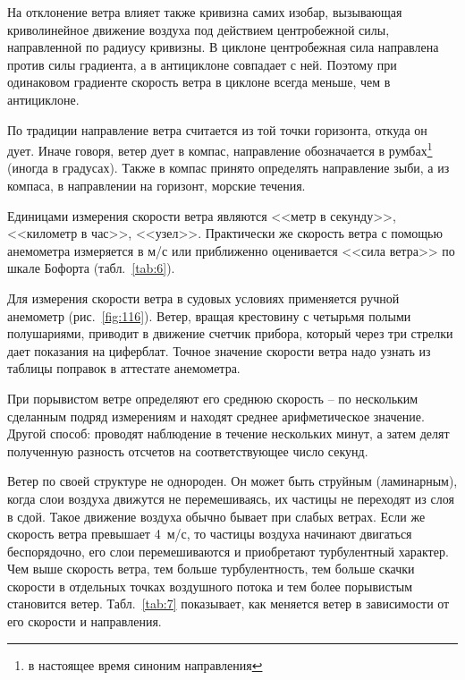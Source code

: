 \documentclass[a4paper, 12pt, twoside, final, book, russian, fittopage, cyremdash]{ncc}
\newcommand{\ris}[1]{\ref{fig:#1}}
\begin{document}
На отклонение ветра влияет также кривизна самих изобар, вызывающая криволинейное движение воздуха под действием центробежной силы, направленной по радиусу кривизны. В циклоне центробежная сила направлена против силы градиента, а в антициклоне совпадает с ней. Поэтому при одинаковом градиенте скорость ветра в циклоне всегда меньше, чем в антициклоне.

По традиции направление ветра считается из той точки горизонта, откуда он дует. Иначе говоря, ветер дует в компас, направление обозначается в румбах\footnote{в настоящее время синоним направления} (иногда в градусах). Также в компас принято определять направление зыби, а из компаса, в направлении на горизонт, морские течения.

Единицами измерения скорости ветра являются <<метр в секунду>>, <<километр в час>>, <<узел>>. Практически же скорость ветра с помощью анемометра измеряется в м/с или приближенно оценивается <<сила ветра>> по шкале Бофорта (табл.~\ref{tab:6}).

Для измерения скорости ветра в судовых условиях применяется ручной анемометр (рис.~\ris{116}). Ветер, вращая крестовину с четырьмя полыми полушариями, приводит в движение счетчик прибора, который через три стрелки дает показания на циферблат. Точное значение скорости ветра надо узнать из таблицы поправок в аттестате анемометра.

При порывистом ветре определяют его среднюю скорость \--- по нескольким сделанным подряд измерениям и находят среднее арифметическое значение. Другой способ: проводят наблюдение в течение нескольких минут, а затем делят полученную разность отсчетов на соответствующее число секунд.

Ветер по своей структуре не однороден. Он может быть струйным (ламинарным), когда слои воздуха движутся не перемешиваясь, их частицы не переходят из слоя в сдой. Такое движение воздуха обычно бывает при слабых ветрах. Если же скорость ветра превышает 4~м/с, то частицы воздуха начинают двигаться беспорядочно, его слои перемешиваются и приобретают турбулентный характер. Чем выше скорость ветра, тем больше турбулентность, тем больше скачки скорости в отдельных точках воздушного потока и тем более порывистым становится ветер. Табл.~\ref{tab:7} показывает, как меняется ветер в зависимости от его скорости и направления.
\end{document}
